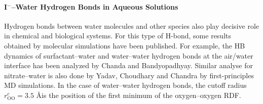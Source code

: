 \paragraph{I$^-$--Water Hydrogen Bonds in Aqueous Solutions}\label{PARAGRAPH_I--W}
Hydrogen bonds between water molecules and other species also play decisive role in chemical and biological systems. 
For this type of H-bond, some results obtained by molecular simulations have been published. For example,
the HB dynamics of surfactant--water and water--water hydrogen bonds at the air/water interface has been analyzed by Chanda 
and Bandyopadhyay.\cite{Chanda2006} 
Similar analyse for nitrate--water is also done by Yadav, Choudhary and Chandra by first-principles MD simulations.\cite{Yadav2017} 
In the case of water--water hydrogen bonds, the cutoff radius $r_\text{OO}^c=3.5$ \AA is the position of the first minimum of the oxygen--oxygen RDF.

